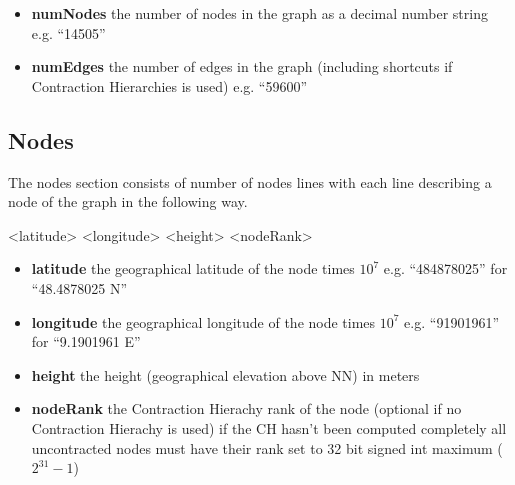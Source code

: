 \documentclass[ngerman,titlepage,parskip=true]{scrartcl}
\begin{document}
\begin{itemize}
 \item 
 \textbf{numNodes} the number of nodes in the graph as a decimal number string e.g. ``14505''
 \item
 \textbf{numEdges} the number of edges in the graph (including shortcuts if Contraction Hierarchies is used) e.g. ``59600''
\end{itemize}


\subsection{Nodes}
The nodes section consists of number of nodes lines with each line describing a node of the graph in the following way.
\begin{verbatim*}
<latitude> <longitude> <height> <nodeRank>
\end{verbatim*}

\begin{itemize}
\item \textbf{latitude} the geographical latitude of the node times $10^7$ e.g. ``484878025'' for ``48.4878025 \textdegree N''
\item \textbf{longitude} the geographical longitude of the node times $10^7$ e.g. ``91901961'' for ``9.1901961 \textdegree E''
\item \textbf{height} the height (geographical elevation above NN) in meters
\item \textbf{nodeRank} the Contraction Hierachy rank of the node (optional if no Contraction Hierachy is used) if the
CH hasn't been computed completely all uncontracted nodes must have their rank set to 32 bit signed int maximum ($2^31 - 1$) 
\end{itemize}
\end{document}
